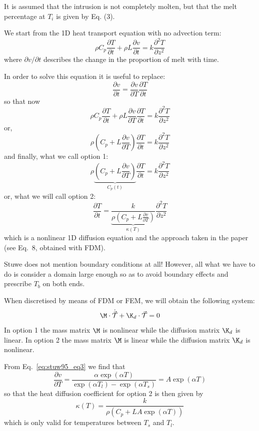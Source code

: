 It is assumed that the
intrusion is not completely molten, but that the
melt percentage at $T_i$ is given by Eq. (3).

We start from the 1D heat transport equation with no advection term:
\[
\rho C_p \frac{\partial T}{\partial t} + \rho L \frac{\partial v}{\partial t} = k  \frac{\partial^2 T}{\partial z^2} 
\]
where $\partial v/ \partial t$ describes the change in the proportion of melt with time.

In order to solve this equation it is useful to replace:
\[
\frac{\partial v}{\partial t} = \frac{\partial v}{\partial T}\frac{\partial T}{\partial t}
\]
so that now
\[
\rho C_p \frac{\partial T}{\partial t} + \rho L 
\frac{\partial v}{\partial T}\frac{\partial T}{\partial t}
= k  \frac{\partial^2 T}{\partial z^2} 
\]
or,
\[
\rho \left(C_p + L \frac{\partial v}{\partial T} \right)
\frac{\partial T}{\partial t} = k  \frac{\partial^2 T}{\partial z^2} 
\]
and finally, what we call option 1:
\[
\boxed{
\rho \underbrace{\left(C_p + L \frac{\partial v}{\partial T} \right)}_{C_p(t)}
\frac{\partial T}{\partial t} = k  \frac{\partial^2 T}{\partial z^2} 
}
\]
or, what we will call option 2:
\[
\boxed{
\frac{\partial T}{\partial t} = 
\underbrace{\frac{k}{\rho \left(C_p + L \frac{\partial v}{\partial T} \right)}}_{\kappa(T)} \frac{\partial^2 T}{\partial z^2} 
}
\]
which is a nonlinear 1D diffusion equation and the approach taken in the paper (see Eq.~8, obtained with FDM).

{\color{red} Stuwe does not mention boundary conditions at all!} However, all what we have to do is consider a domain large enough so as to avoid boundary effects and prescribe $T_b$ on both ends.

When discretised by means of FDM or FEM, we will obtain the following system:
\[
\M \cdot \dot{\vec{{\cal T}}} + \K_d \cdot \vec{\cal T} = 0
\]
In option 1 the mass matrix $\M$ is nonlinear while the diffusion matrix $\K_d$ is linear.
In option 2 the mass matrix $\M$ is linear while the diffusion matrix $\K_d$ is nonlinear.

From Eq.~\eqref{eq:stuw95_eq3} we find that
\[
\frac{\partial v}{\partial T}  
= \frac{\alpha \exp (\alpha T) }{\exp(\alpha T_l) - \exp(\alpha T_s) } 
=A \exp (\alpha T)
\]
so that the heat diffusion coefficient for option 2 is then given by
\[
\kappa(T) = \frac{k}{\rho \left(C_p + L A \exp(\alpha T) \right)}
\]
which is only valid for temperatures between $T_s$ and $T_l$.


